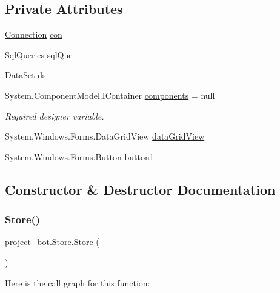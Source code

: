 \subsection*{Private Attributes}
\begin{DoxyCompactItemize}
\item 
\hyperlink{classproject__bot_1_1_connection}{Connection} \hyperlink{classproject__bot_1_1_store_a0caeadd0bb7c9f94943730e638482840}{con}
\item 
\hyperlink{classproject__bot_1_1_sql_queries}{Sql\+Queries} \hyperlink{classproject__bot_1_1_store_a01d9a06235da356cb1f4998345e0d933}{sql\+Que}
\item 
Data\+Set \hyperlink{classproject__bot_1_1_store_a2ef084860ab026e2198446e958c6a904}{ds}
\item 
System.\+Component\+Model.\+I\+Container \hyperlink{classproject__bot_1_1_store_a0e2038bf36efab6357f3c34b52c0034a}{components} = null
\begin{DoxyCompactList}\small\item\em Required designer variable. \end{DoxyCompactList}\item 
System.\+Windows.\+Forms.\+Data\+Grid\+View \hyperlink{classproject__bot_1_1_store_a661c80473c748fcf645e97dc7146f062}{data\+Grid\+View}
\item 
System.\+Windows.\+Forms.\+Button \hyperlink{classproject__bot_1_1_store_ae028991aa972f398a964145e5cf935a9}{button1}
\end{DoxyCompactItemize}


\subsection{Constructor \& Destructor Documentation}
\mbox{\label{classproject__bot_1_1_store_a976f5080cbc11032a96aace4925c61a9}} 
\subsubsection{\texorpdfstring{Store()}{Store()}}
{\footnotesize\ttfamily project\+\_\+bot.\+Store.\+Store (\begin{DoxyParamCaption}{ }\end{DoxyParamCaption})}

Here is the call graph for this function\+:


